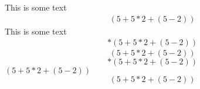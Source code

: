 This is some text
\begin{align}\label{equ1(good)}%
\left(5+5*2+\left(5-2\right)\right)%
\end{align}
This is some text
\begin{align}*
\left(5+5*2+\left(5-2\right)\right)
\end{align}
\begin{equation}\label{equ2(good)}
\left(5+5*2+\left(5-2\right)\right)%
\end{equation}
\begin{equation}*
\left(5+5*2+\left(5-2\right)\right)
\end{equation}
\(\left(5+5*2+\left(5-2\right)\right)\)
\[\left(5+5*2+\left(5-2\right)\right)\]
